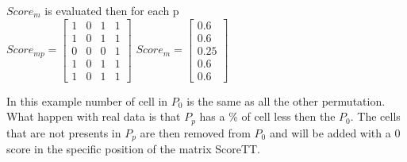 \documentclass[12pt]{article}
\begin{document}
$Score_m$ is evaluated then for each p\\ 

$ Score_{mp}=\begin{bmatrix}
1 & 0 & 1 & 1 \\
1 & 0 & 1 & 1 \\
0 & 0 & 0 & 1 \\
1 & 0 & 1 & 1 \\
1 & 0 & 1 & 1 
\end{bmatrix}  $
$ Score_m=\begin{bmatrix}
0.6 \\
0.6 \\
0.25 \\
0.6 \\
0.6 
\end{bmatrix}  $

In this example number of cell in $P_0$ is the same as all the other permutation. What happen with real data is that $P_p$ has a \% of cell less then the $P_0$. The cells that are not presents in $P_p$ are then removed from $P_0$ and will be added with a 0 score in the specific position of the matrix ScoreTT. 


\end{document}
